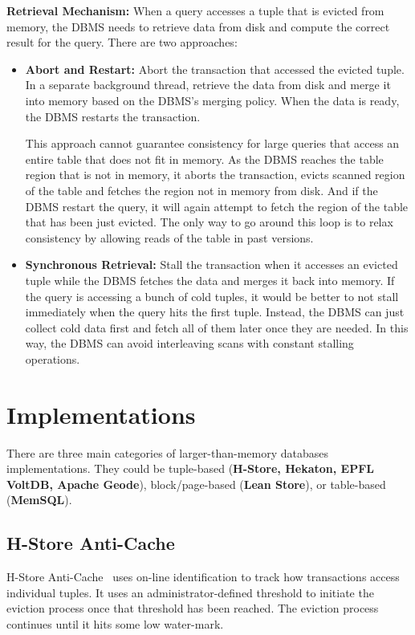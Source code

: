 \documentclass[11pt]{article}
\begin{document}
\textbf{Retrieval Mechanism:} When a query accesses a tuple that is evicted from memory, the DBMS needs to retrieve data from disk and compute the correct result for the query. There are two approaches:
\begin{itemize}
    \item \textbf{Abort and Restart:} Abort the transaction that accessed the evicted tuple. In a separate background thread, retrieve the data from disk and merge it into memory based on the DBMS's merging policy. When the data is ready, the DBMS restarts the transaction. 
    
    This approach cannot guarantee consistency for large queries that access an entire table that does not fit in memory. As the DBMS reaches the table region that is not in memory, it aborts the transaction, evicts scanned region of the table and fetches the region not in memory from disk. And if the DBMS restart the query, it will again attempt to fetch the region of the table that has been just evicted. The only way to go around this loop is to relax consistency by allowing reads of the table in past versions.
    \item \textbf{Synchronous Retrieval:} Stall the transaction when it accesses an evicted tuple while the DBMS fetches the data and merges it back into memory. If the query is accessing a bunch of cold tuples, it would be better to not stall immediately when the query hits the first tuple. Instead, the DBMS can just collect cold data first and fetch all of them later once they are needed. In this way, the DBMS can avoid interleaving scans with constant stalling operations.
\end{itemize}

\section{Implementations}
There are three main categories of larger-than-memory databases implementations. They could be tuple-based (\textbf{H-Store, Hekaton, EPFL VoltDB, Apache Geode}), block/page-based (\textbf{Lean Store}), or table-based (\textbf{MemSQL}).

\subsection*{H-Store Anti-Cache}
H-Store Anti-Cache~\cite{DeBrabant:2013} uses on-line identification to track how transactions access individual tuples. It uses an administrator-defined threshold to initiate the eviction process once that threshold has been reached. The eviction process continues until it hits some low water-mark. 
\end{document}
